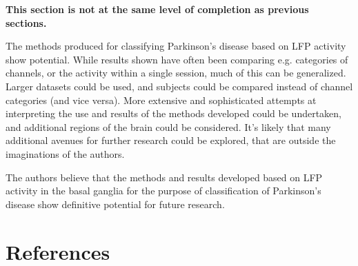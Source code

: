 \documentclass{article}
\begin{document}
\textbf{This section is not at the same level of completion as previous sections.}

The methods produced for classifying Parkinson's disease based on LFP activity show potential.
While results shown have often been comparing e.g. categories of channels, or the activity within a single session, much of this can be generalized.
Larger datasets could be used, and subjects could be compared instead of channel categories (and vice versa).
More extensive and sophisticated attempts at interpreting the use and results of the methods developed could be undertaken, and additional regions of the brain could be considered.
It's likely that many additional avenues for further research could be explored, that are outside the imaginations of the authors.

The authors believe that the methods and results developed based on LFP activity in the basal ganglia for the purpose of classification of Parkinson's disease show definitive potential for future research.

\newpage
\section{References}

\end{document}
